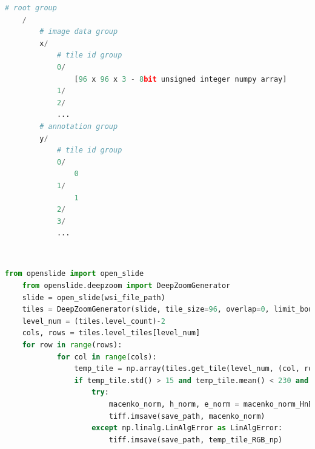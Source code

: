 \documentclass{l4proj}
\begin{document}
\begin{appendices}
\begin{lstlisting}[language=python, caption={PCAM Data HDF5 schema - Each set has a group labeled 'x' - containing all the tiles as numpy arrays of 8-bit unsigned integers. Each array has a unique id (0, 1, 2...) and shape \(96 \times 96 \times 3\) indicating a \(96 \times 96\)px RGB tile. The second group labeled 'y' contains the annotations for each tile. The annotations are shown as binary labels against each tile id. }, label= lst:pcam-hdf5]
    # root group
    /
        # image data group
        x/
            # tile id group
            0/
                [96 x 96 x 3 - 8bit unsigned integer numpy array]
            1/
            2/
            ...
        # annotation group
        y/
            # tile id group
            0/
                0
            1/
                1
            2/
            3/
            ...
\end{lstlisting}
\hfill \\
\begin{lstlisting}[language=python, caption={Code excerpt showing how OpenSlide and DeepZoomGenerator are used to obtain tiles of specified dimension and resolution level from an input WSI image and saving them as a .tiff image. We also added a modification to normalize each tile (explained in the next section) before saving. It calls \texttt{macenko\_norm\_HnE()} on each tile's numpy array and saves the normalized image. We also catch any SVD convergence errors thrown by tiles that have large areas of white space. This is the case for external tiles containing debris outside the main body of tissue.}, label= lst:tiling-code]
    from openslide import open_slide
    from openslide.deepzoom import DeepZoomGenerator
    slide = open_slide(wsi_file_path)
    tiles = DeepZoomGenerator(slide, tile_size=96, overlap=0, limit_bounds=False)
    level_num = (tiles.level_count)-2
    cols, rows = tiles.level_tiles[level_num]
    for row in range(rows):
            for col in range(cols):
                temp_tile = np.array(tiles.get_tile(level_num, (col, row)).convert('RGB'))
                if temp_tile.std() > 15 and temp_tile.mean() < 230 and temp_tile.shape == (96,96,3):
                    try:
                        macenko_norm, h_norm, e_norm = macenko_norm_HnE(temp_tile)
                        tiff.imsave(save_path, macenko_norm)
                    except np.linalg.LinAlgError as LinAlgError:
                        tiff.imsave(save_path, temp_tile_RGB_np)
\end{lstlisting}


\end{appendices}
\end{document}
